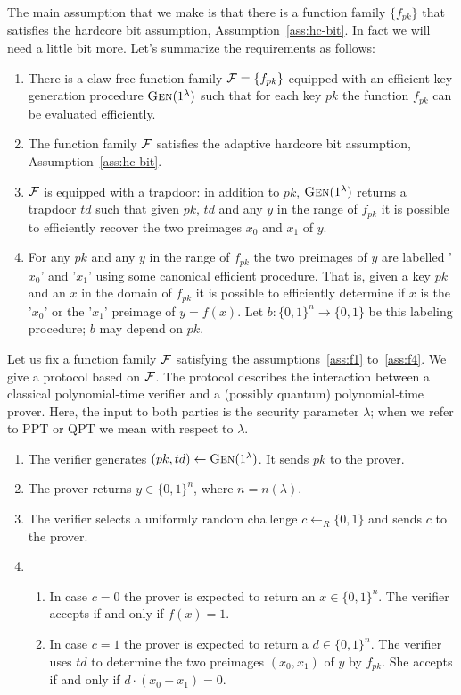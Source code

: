  The main assumption that we make is that there is a function family $\{f_{pk}\}$ that satisfies the hardcore bit assumption, Assumption~\ref{ass:hc-bit}. In fact we will need a little bit more. Let's summarize the requirements as follows:
\begin{enumerate}[label=(\textbf{F.\arabic*})]
\item\label{ass:f1} There is a claw-free function family $\mathcal{F} = \{f_{pk}\}$ equipped with an efficient key generation procedure $\textsc{Gen}(1^\lambda)$ such that for each key $pk$ the function $f_{pk}$ can be evaluated efficiently.
\item \label{ass:f2}The function family $\mathcal{F}$ satisfies the adaptive hardcore bit assumption, Assumption~\ref{ass:hc-bit}.
\item\label{ass:f3} $\mathcal{F}$ is equipped with a trapdoor: in addition to $pk$, $\textsc{Gen}(1^\lambda)$ returns a trapdoor $td$ such that given $pk$, $td$ and any $y$ in the range of $f_{pk}$ it is possible to efficiently recover the two preimages $x_0$ and $x_1$ of $y$. 
\item\label{ass:f4} For any $pk$ and any $y$ in the range of $f_{pk}$ the two preimages of $y$ are labelled '$x_0$' and '$x_1$' using some canonical efficient procedure. That is, given a key $pk$ and an $x$ in the domain of $f_{pk}$ it is possible to efficiently determine if $x$ is the '$x_0$' or the '$x_1$' preimage of $y=f(x)$. Let $b:\{0,1\}^n \to \{0,1\}$ be this labeling procedure; $b$ may depend on $pk$. 
\end{enumerate}
Let us fix a function family $\mathcal{F}$ satisfying the assumptions~\ref{ass:f1} to~\ref{ass:f4}. We give a protocol based on $\mathcal{F}$. The protocol describes the interaction between a classical polynomial-time verifier and a (possibly quantum) polynomial-time prover. Here, the input to both parties is the security parameter $\lambda$; when we refer to PPT or QPT we mean with respect to $\lambda$.
\begin{enumerate}
\item The verifier generates $(pk,td)\leftarrow \textsc{Gen}(1^\lambda)$. It sends $pk$ to the prover. 
\item The prover returns $y \in \{0,1\}^n$, where $n=n(\lambda)$. 
\item The verifier selects a uniformly random challenge $c\leftarrow_R \{0,1\}$ and sends $c$ to the prover. 
\item 
\begin{enumerate}
\item In case $c=0$ the prover is expected to return an $x\in\{0,1\}^n$. The verifier accepts if and only if $f(x)=1$. 
\item In case $c=1$ the prover is expected to return a $d\in \{0,1\}^n$. The verifier uses $td$ to determine the two preimages $(x_0,x_1)$ of $y$ by $f_{pk}$. She accepts if and only if $d\cdot(x_0+ x_1)=0$. 
\end{enumerate}
\end{enumerate}


